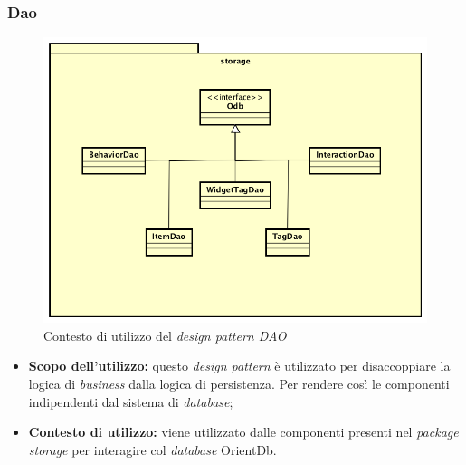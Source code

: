 \subsubsection{Dao}
\begin{figure}[h]
\centering
\includegraphics[scale=0.20]{immagini/storage}
\caption{Contesto di utilizzo del \emph{design pattern DAO}}
\label{fig:pattern-dao}
\end{figure}
\begin{itemize}
\item\textbf{Scopo dell'utilizzo:} questo \emph{design pattern} è utilizzato per disaccoppiare la logica di \emph{business} dalla logica di persistenza. Per rendere così le componenti indipendenti dal sistema di \emph{database};
\item \textbf{Contesto di utilizzo:} viene utilizzato dalle componenti presenti nel \emph{package storage} per interagire col \emph{database} OrientDb.
\end{itemize}
